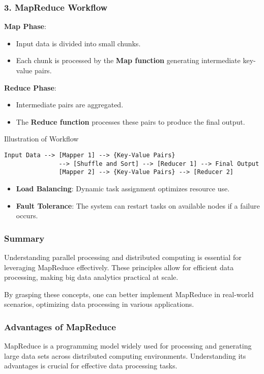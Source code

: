 \documentclass[aspectratio=169]{beamer}
\begin{document}
\begin{frame}[fragile]
    \frametitle{3. MapReduce Workflow}
    \textbf{Map Phase}:
    \begin{itemize}
        \item Input data is divided into small chunks.
        \item Each chunk is processed by the \textbf{Map function} generating intermediate key-value pairs.
    \end{itemize}

    \textbf{Reduce Phase}:
    \begin{itemize}
        \item Intermediate pairs are aggregated.
        \item The \textbf{Reduce function} processes these pairs to produce the final output.
    \end{itemize}

    \begin{block}{Illustration of Workflow}
        \begin{verbatim}
Input Data --> [Mapper 1] --> {Key-Value Pairs} 
               --> [Shuffle and Sort] --> [Reducer 1] --> Final Output
               [Mapper 2] --> {Key-Value Pairs} --> [Reducer 2]
        \end{verbatim}
    \end{block}

    \begin{itemize}
        \item \textbf{Load Balancing}: Dynamic task assignment optimizes resource use.
        \item \textbf{Fault Tolerance}: The system can restart tasks on available nodes if a failure occurs.
    \end{itemize}
\end{frame}

\begin{frame}[fragile]
    \frametitle{Summary}
    Understanding parallel processing and distributed computing is essential for leveraging MapReduce effectively. These principles allow for efficient data processing, making big data analytics practical at scale.
    
    By grasping these concepts, one can better implement MapReduce in real-world scenarios, optimizing data processing in various applications.
\end{frame}

\begin{frame}[fragile]
  \frametitle{Advantages of MapReduce}
  MapReduce is a programming model widely used for processing and generating large data sets across distributed computing environments. 
  Understanding its advantages is crucial for effective data processing tasks.
\end{frame}
\end{document}
